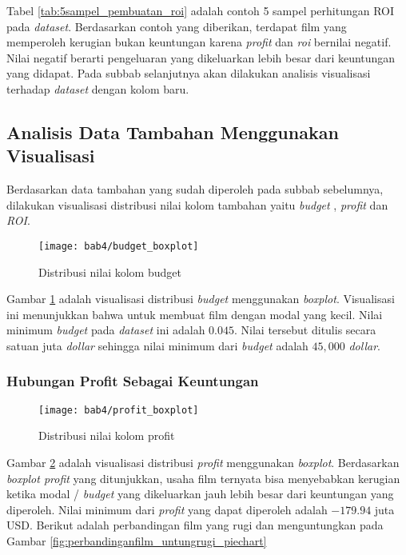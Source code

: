 Tabel \ref{tab:5sampel_pembuatan_roi} adalah contoh 5 sampel perhitungan ROI pada \textit{dataset}. Berdasarkan contoh yang diberikan, terdapat film yang memperoleh kerugian bukan keuntungan karena \textit{profit} dan \textit{roi} bernilai negatif. Nilai negatif berarti pengeluaran yang dikeluarkan lebih besar dari keuntungan yang didapat. Pada subbab selanjutnya akan dilakukan analisis visualisasi terhadap \textit{dataset} dengan kolom baru.


\subsection{Analisis Data Tambahan Menggunakan Visualisasi}
Berdasarkan data tambahan yang sudah diperoleh pada subbab sebelumnya, dilakukan visualisasi distribusi nilai kolom tambahan yaitu \textit{budget} , \textit{profit} dan \textit{ROI}.

\begin{figure}[H]
	\centering  
	\texttt{[image: bab4/budget\_boxplot]}   
	\caption{Distribusi nilai kolom budget}
	\label{fig:budget_boxplot} 
\end{figure} 


Gambar \ref{fig:budget_boxplot} adalah visualisasi distribusi \textit{budget} menggunakan \textit{boxplot}. Visualisasi ini menunjukkan bahwa untuk membuat film dengan modal yang kecil. Nilai minimum \textit{budget} pada \textit{dataset} ini adalah $0.045$. Nilai tersebut ditulis secara satuan juta \textit{dollar} sehingga nilai minimum dari \textit{budget} adalah $45,000$ \textit{dollar}. 

\subsubsection{Hubungan Profit Sebagai Keuntungan}

\begin{figure}[H]
	\centering  
	\texttt{[image: bab4/profit\_boxplot]}   
	\caption{Distribusi nilai kolom profit}
	\label{fig:profit_boxplot} 
\end{figure} 

Gambar \ref{fig:profit_boxplot} adalah visualisasi distribusi \textit{profit} menggunakan \textit{boxplot}. Berdasarkan \textit{boxplot profit} yang ditunjukkan, usaha film ternyata bisa menyebabkan kerugian ketika modal / \textit{budget} yang dikeluarkan jauh lebih besar dari keuntungan yang diperoleh. Nilai minimum dari \textit{profit} yang dapat diperoleh adalah $-179.94$ juta USD. Berikut adalah perbandingan film yang rugi dan menguntungkan pada Gambar \ref{fig:perbandinganfilm_untungrugi_piechart}


